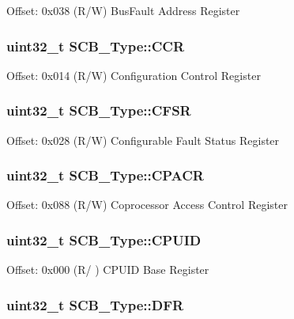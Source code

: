 Offset\-: 0x038 (R/\-W) Bus\-Fault Address Register \hypertarget{structSCB__Type_a6d273c6b90bad15c91dfbbad0f6e92d8}{
\subsubsection[{C\-C\-R}]{ uint32\-\_\-t S\-C\-B\-\_\-\-Type\-::\-C\-C\-R}}\label{structSCB__Type_a6d273c6b90bad15c91dfbbad0f6e92d8}
Offset\-: 0x014 (R/\-W) Configuration Control Register \hypertarget{structSCB__Type_a2f94bf549b16fdeb172352e22309e3c4}{
\subsubsection[{C\-F\-S\-R}]{ uint32\-\_\-t S\-C\-B\-\_\-\-Type\-::\-C\-F\-S\-R}}\label{structSCB__Type_a2f94bf549b16fdeb172352e22309e3c4}
Offset\-: 0x028 (R/\-W) Configurable Fault Status Register \hypertarget{structSCB__Type_af460b56ce524a8e3534173f0aee78e85}{
\subsubsection[{C\-P\-A\-C\-R}]{ uint32\-\_\-t S\-C\-B\-\_\-\-Type\-::\-C\-P\-A\-C\-R}}\label{structSCB__Type_af460b56ce524a8e3534173f0aee78e85}
Offset\-: 0x088 (R/\-W) Coprocessor Access Control Register \hypertarget{structSCB__Type_afa7a9ee34dfa1da0b60b4525da285032}{
\subsubsection[{C\-P\-U\-I\-D}]{ uint32\-\_\-t S\-C\-B\-\_\-\-Type\-::\-C\-P\-U\-I\-D}}\label{structSCB__Type_afa7a9ee34dfa1da0b60b4525da285032}
Offset\-: 0x000 (R/ ) C\-P\-U\-I\-D Base Register \hypertarget{structSCB__Type_a586a5225467262b378c0f231ccc77f86}{
\subsubsection[{D\-F\-R}]{ uint32\-\_\-t S\-C\-B\-\_\-\-Type\-::\-D\-F\-R}}\label{structSCB__Type_a586a5225467262b378c0f231ccc77f86}
